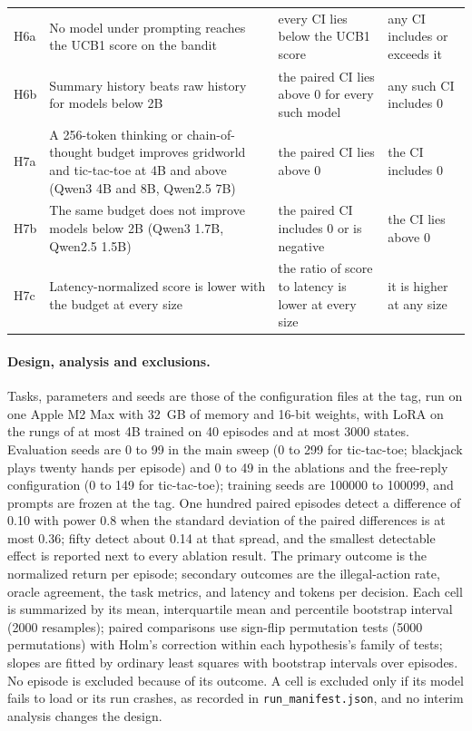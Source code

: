 \begin{table}[h]
\begin{tabularx}{\linewidth}{@{}l X X X@{}}
H6a & No model under prompting reaches the UCB1 score on the bandit & every CI lies below the UCB1 score & any CI includes or exceeds it\\
H6b & Summary history beats raw history for models below 2B & the paired CI lies above 0 for every such model & any such CI includes 0\\
H7a & A 256-token thinking or chain-of-thought budget improves gridworld and tic-tac-toe at 4B and above (Qwen3 4B and 8B, Qwen2.5 7B) & the paired CI lies above 0 & the CI includes 0\\
H7b & The same budget does not improve models below 2B (Qwen3 1.7B, Qwen2.5 1.5B) & the paired CI includes 0 or is negative & the CI lies above 0\\
H7c & Latency-normalized score is lower with the budget at every size & the ratio of score to latency is lower at every size & it is higher at any size\\
\bottomrule
\end{tabularx}
\end{table}

\paragraph{Design, analysis and exclusions.}
Tasks, parameters and seeds are those of the configuration files at the tag, run on one Apple M2 Max with 32~GB of memory and 16-bit weights, with LoRA on the rungs of at most 4B trained on 40 episodes and at most 3000 states. Evaluation seeds are 0 to 99 in the main sweep (0 to 299 for tic-tac-toe; blackjack plays twenty hands per episode) and 0 to 49 in the ablations and the free-reply configuration (0 to 149 for tic-tac-toe); training seeds are 100000 to 100099, and prompts are frozen at the tag. One hundred paired episodes detect a difference of 0.10 with power 0.8 when the standard deviation of the paired differences is at most 0.36; fifty detect about 0.14 at that spread, and the smallest detectable effect is reported next to every ablation result. The primary outcome is the normalized return per episode; secondary outcomes are the illegal-action rate, oracle agreement, the task metrics, and latency and tokens per decision. Each cell is summarized by its mean, interquartile mean and percentile bootstrap interval (2000 resamples); paired comparisons use sign-flip permutation tests (5000 permutations) with Holm's correction within each hypothesis's family of tests; slopes are fitted by ordinary least squares with bootstrap intervals over episodes. No episode is excluded because of its outcome. A cell is excluded only if its model fails to load or its run crashes, as recorded in \texttt{run\_manifest.json}, and no interim analysis changes the design.

